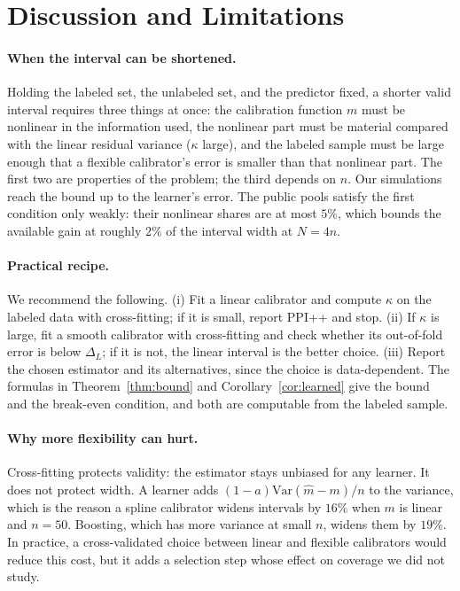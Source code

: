 \section{Discussion and Limitations}
\label{sec:discussion}

\paragraph{When the interval can be shortened.}
Holding the labeled set, the unlabeled set, and the predictor fixed, a shorter valid interval requires three things at once: the calibration function $m$ must be nonlinear in the information used, the nonlinear part must be material compared with the linear residual variance ($\kappa$ large), and the labeled sample must be large enough that a flexible calibrator's error is smaller than that nonlinear part. The first two are properties of the problem; the third depends on $n$. Our simulations reach the bound up to the learner's error. The public pools satisfy the first condition only weakly: their nonlinear shares are at most $5\%$, which bounds the available gain at roughly $2\%$ of the interval width at $N=4n$.

\paragraph{Practical recipe.}
We recommend the following. (i) Fit a linear calibrator and compute $\kappa$ on the labeled data with cross-fitting; if it is small, report PPI++ and stop. (ii) If $\kappa$ is large, fit a smooth calibrator with cross-fitting and check whether its out-of-fold error is below $\Delta_L$; if it is not, the linear interval is the better choice. (iii) Report the chosen estimator and its alternatives, since the choice is data-dependent. The formulas in Theorem~\ref{thm:bound} and Corollary~\ref{cor:learned} give the bound and the break-even condition, and both are computable from the labeled sample.

\paragraph{Why more flexibility can hurt.}
Cross-fitting protects validity: the estimator stays unbiased for any learner. It does not protect width. A learner adds $(1-a)\mathrm{Var}(\hat m-m)/n$ to the variance, which is the reason a spline calibrator widens intervals by $16\%$ when $m$ is linear and $n=50$. Boosting, which has more variance at small $n$, widens them by $19\%$. In practice, a cross-validated choice between linear and flexible calibrators would reduce this cost, but it adds a selection step whose effect on coverage we did not study.

